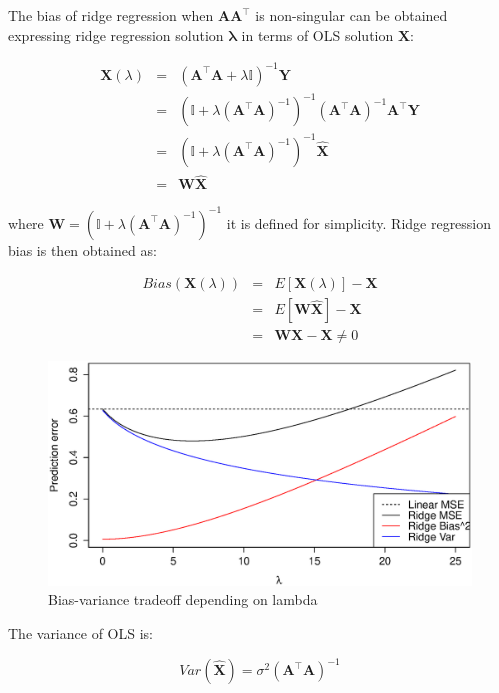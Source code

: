 The bias of ridge regression when $\mathbf{A A^\top}$ is non-singular
can be obtained expressing ridge regression solution
$\mathbf{\lambda}$ in terms of OLS solution $\hat{\mathbf{X}}$:

\begin{eqnarray*}
\mathbf{X}(\lambda) &=&( \mathbf{A}^\top \mathbf{A} + \lambda \mathbb{I})^{-1}\mathbf{Y} \\
&=& (\mathbb{I} + \lambda (\mathbf{A}^\top \mathbf{A})^{-1})^{-1} (\mathbf{A}^\top \mathbf{A})^{-1}\mathbf{A}^\top \mathbf{Y} \\
&=&  (\mathbb{I} + \lambda (\mathbf{A}^\top \mathbf{A})^{-1})^{-1}  \hat{\mathbf{X}} \\
&=& \mathbf{W} \hat{\mathbf{X}} 
\end{eqnarray*}

\noindent where $\mathbf{W}  = (\mathbb{I} + \lambda (\mathbf{A}^\top
\mathbf{A})^{-1})^{-1}  $ it is defined for simplicity. Ridge
regression bias is then obtained as:

\begin{eqnarray*}
Bias(\mathbf{X}(\lambda)) &=& E[\mathbf{X}(\lambda)] - \mathbf{X} \\
&=& E[\mathbf{W}\hat{\mathbf{X}}] - \mathbf{X} \\
&=&  \mathbf{W} \mathbf{X} - \mathbf{X} \neq 0 
\end{eqnarray*}

\begin{figure}[h!]
\includegraphics[width=\linewidth]{img/biasvariance}
\caption{Bias-variance tradeoff depending on lambda}
\label{fig:biasvariance}
\end{figure}	

The variance of OLS is:

\begin{equation*}
Var(\hat{\mathbf{X}}) = \sigma^2 (\mathbf{A}^\top \mathbf{A} )^{-1}
\end{equation*}

